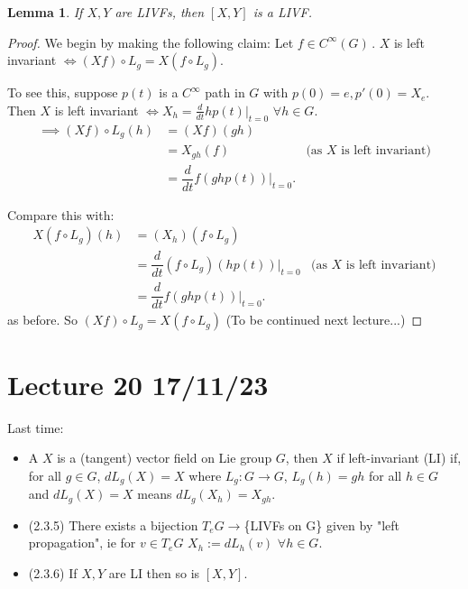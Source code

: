 \documentclass[12pt,a4paper]{article}
\newcommand{\rR}{\ensuremath{\mathbb{R}\,}}
\newcommand{\cinfn}[1]{\ensuremath{C^{\infty}(#1)\,}}
\newtheorem{lemma}[thm]{Lemma}
\begin{document}
\begin{lemma}
If $X, Y$ are LIVFs, then $[X, Y]$ is a LIVF.
\end{lemma}

\begin{proof}
We begin by making the following claim: Let $f\in \cinfn{G}$. $X$ is left invariant $\iff (Xf)\circ L_g = X(f\circ L_g).$

\begin{center}
\end{center}
To see this, suppose $p(t)$ is a $C^\infty$ path in $G$ with $p(0) = e, p'(0) = X_e.$ Then $X$ is left invariant $\iff X_h = \frac{d}{dt}hp(t)|_{t=0} \,\, \forall h \in G.$
\begin{align*}
\implies (Xf) \circ L_g(h) &= (Xf)(gh) & \\
&= X_{gh}(f) & \mbox{(as $X$ is left invariant)} \\
&= \dfrac{d}{dt}f(ghp(t))|_{t=0}. &
\end{align*}

Compare this with:
\begin{align*}
X(f\circ L_g)(h) &= (X_h)(f\circ L_g) & \\
&= \dfrac{d}{dt} (f\circ L_g)(hp(t))|_{t=0} & \mbox{(as $X$ is left invariant)} \\
&= \dfrac{d}{dt}f(ghp(t))|_{t=0}. &
\end{align*}
as before. So $(Xf)\circ L_g = X(f\circ L_g)$ (To be continued next lecture...)
\end{proof}


\section{Lecture 20 17/11/23}

Last time:

\begin{itemize}
\item A $X$ is a (tangent) vector field on Lie group $G$, then $X$ if left-invariant (LI) if, for all $g \in G$, $dL_g(X) = X$ where $L_g:G\to G$, $L_g(h) = gh$ for all $h\in G$ and $dL_g(X) = X$ means $dL_g(X_h) = X_{gh}$.

\item (2.3.5) There exists a bijection $T_eG\to $\{{LIVFs on G}\} given by "left propagation", ie for $v\in T_eG$ $X_h := dL_h(v) \,\, \forall h \in G$.

\item (2.3.6) If $X, Y$ are LI then so is $[X, Y]$.
\end{itemize}
\end{document}
